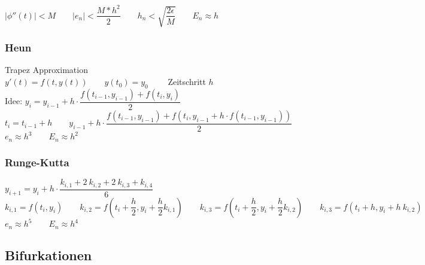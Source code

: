 $|\phi''(t)|<M \qquad |e_n| < \dfrac{M*h^2}{2} \qquad
h_n < \sqrt{\dfrac{2\epsilon}{M}} \qquad E_n \approx h$
\subsubsection{Heun}
Trapez Approximation\\
$y'(t)=f(t,y(t)) \qquad y(t_0)=y_0 \qquad$ Zeitschritt $h$\\
Idee: $y_i=y_{i-1} + h \cdot \dfrac{f(t_{i-1},y_{i-1}) + f(t_{i},y_{i})}{2}$\\
$t_i = t_{i-1} + h \qquad y_{i-1} + h \cdot \dfrac{f(t_{i-1},y_{i-1}) + f(t_{i},y_{i-1} + h \cdot f(t_{i-1},y_{i-1}))}{2}$\\
$e_n \approx h^3 \qquad E_n \approx h^2$
\subsubsection{Runge-Kutta}
$y_{i+1}=y_i + h \cdot \dfrac{k_{i,1} + 2\:k_{i,2} + 2\:k_{i,3} + k_{i,4} }{6}$\\
$k_{i,1} = f(t_{i},y_{i}) \qquad 
k_{i,2} = f(t_{i} + \dfrac{h}{2},y_{i} + \dfrac{h}{2}k_{i,1}) \qquad 
k_{i,3} = f(t_{i} + \dfrac{h}{2},y_{i} + \dfrac{h}{2}k_{i,2}) \qquad 
k_{i,3} = f(t_{i} + h,y_{i} + h \: k_{i,2}) \qquad$\\
$e_n \approx h^5 \qquad E_n \approx h^4$
\subsection{Bifurkationen}

